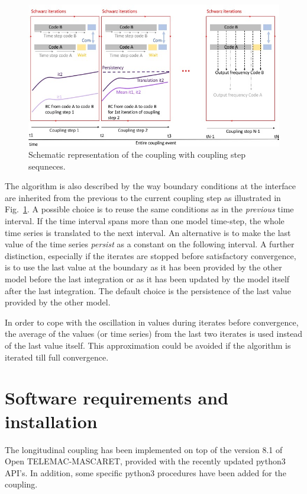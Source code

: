 \documentclass[Coupling]{../../data/TelemacDoc} %
\begin{document}
\begin{figure}[htbp]
    \centering
        \centering \includegraphics[width=12cm]{figures/schemacoupling_time2.jpeg}
    \caption{Schematic representation of the coupling with coupling step sequneces.}\label{fig:schemacoupling_time2}
\end{figure}
The algorithm is also described by the way boundary
conditions at the interface are inherited from the previous to the
current coupling step as illustrated in Fig.~\ref{fig:schemacoupling_time2}. A
possible choice is to reuse the same
conditions as in the \emph{previous} time interval. If the time
interval spans more than one model time-step, the whole time series is
translated to the next interval. An alternative is to make the last
value of the time series \emph{persist} as a constant on the following
interval. A further distinction, especially if the iterates are stopped
before satisfactory convergence, is to use the last value at the
boundary as it has been provided by the other model before the last
integration or as it has been updated by the model itself after the last
integration. The default choice is the persistence of the last value
provided by the other model.

In order to cope with the oscillation in values during iterates before
convergence, the average of the values (or time series) from the last
two iterates is used instead of the last value itself. This
approximation could be avoided if the algorithm is iterated till full
convergence. 

\chapter{Software requirements and installation}

The longitudinal coupling has been implemented on top of the version
8.1 of Open TELEMAC-MASCARET, provided with the recently updated
python3 API's. In addition, some specific python3 procedures have been
added for the coupling.
\newline
\end{document}
